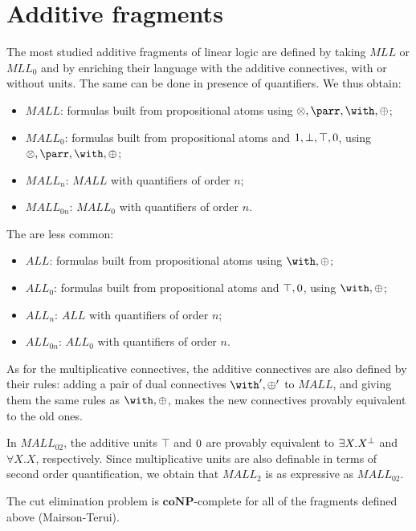 \section{Additive fragments}\label{additive-fragments}

The most studied additive fragments of linear logic are defined by
taking \(MLL\) or \(MLL_0\) and by enriching their language with the
additive connectives, with or without units. The same can be done in
presence of quantifiers. We thus obtain:
\begin{itemize}
\item
  \(MALL\): formulas built from propositional atoms using
  \(\tens,\parr,\with,\plus\);
\item
  \(MALL_0\): formulas built from propositional atoms and
  \(1,\bot,\top,0\), using \(\tens,\parr,\with,\plus\);
\item
  \(MALL_n\): \(MALL\) with quantifiers of order \(n\);
\item
  \(MALL_{0n}\): \(MALL_0\) with quantifiers of order \(n\).
\end{itemize}

The  are less
common:
\begin{itemize}
\item
  \(ALL\): formulas built from propositional atoms using
  \(\with,\plus\);
\item
  \(ALL_0\): formulas built from propositional atoms and \(\top,0\),
  using \(\with,\plus\);
\item
  \(ALL_n\): \(ALL\) with quantifiers of order \(n\);
\item
  \(ALL_{0n}\): \(ALL_0\) with quantifiers of order \(n\).
\end{itemize}

As for the multiplicative connectives, the additive connectives are also
defined by their rules: adding a pair of dual connectives
\(\with',\plus'\) to \(MALL\), and giving them the same rules as
\(\with,\plus\), makes the new connectives provably equivalent to the
old ones.

In \(MALL_{02}\), the additive units \(\top\) and \(0\) are provably
equivalent to \(\exists X.X^\bot\) and \(\forall X.X\), respectively.
Since multiplicative units are also definable in terms of second order
quantification, we obtain that \(MALL_2\) is as expressive as
\(MALL_{02}\).

The cut elimination problem is \(\mathbf{coNP}\)-complete for all of the
fragments defined above (Mairson-Terui).

